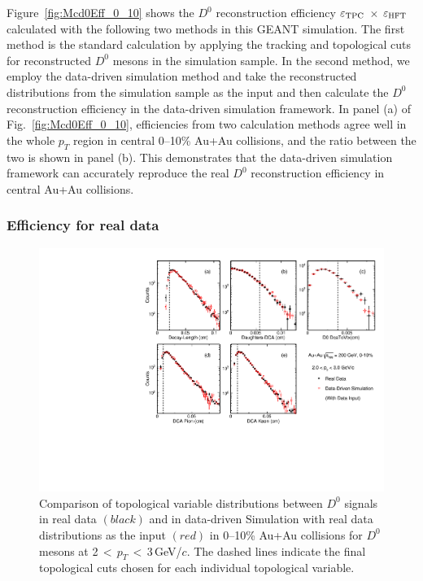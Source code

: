\documentclass[%
 reprint,	
 amsmath,amssymb,
 aps,
 prc,
]{revtex4-1}
\begin{document}
Figure~\ref{fig:Mcd0Eff_0_10} shows the $D^0$ reconstruction efficiency $\varepsilon_{\rm TPC}$ $\times$ $\varepsilon_{\rm HFT}$ calculated with the following two methods in this GEANT simulation. The first method is the standard calculation by applying the tracking and topological cuts for reconstructed $D^0$ mesons in the simulation sample. In the second method, we employ the data-driven simulation method and take the reconstructed distributions from the simulation sample as the input and then calculate the $D^0$ reconstruction efficiency in the data-driven simulation framework. In panel (a) of Fig.~\ref{fig:Mcd0Eff_0_10}, efficiencies from two calculation methods agree well in the whole $p_{T}$ region in central 0--10\% Au+Au collisions, and the ratio between the two is shown in panel (b). This demonstrates that the data-driven simulation framework can accurately reproduce the real $D^0$ reconstruction efficiency in central Au+Au collisions.


\subsubsection{Efficiency for real data}
\label{correction:hft:fordata}

\begin{figure}
\centering
\includegraphics[width=1.0\textwidth]{fig/DataTopo.pdf}
\caption{Comparison of topological variable distributions between $D^0$ signals in real data $(black)$ and in data-driven Simulation with real data distributions as the input $(red)$ in 0--10\% Au+Au collisions for $D^0$ mesons at 2\,$<$\,$p_T$\,$<$\,3\,GeV/$c$. The dashed lines indicate the final topological cuts chosen for each individual topological variable.}
\label{fig:DataTopo} 
\end{figure}
\end{document}
